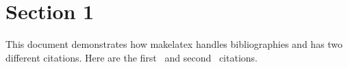 \documentclass[letterpaper,12pt]{article}
\begin{document}
\section{Section 1}


This document demonstrates how makelatex handles bibliographies and has two different citations. Here are the first~\cite{chicago} and second~\cite{latexbook} citations.

\lipsum[1-3]




\end{document}
